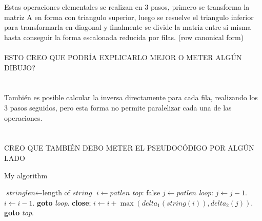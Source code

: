 Estas operaciones elementales se realizan en 3 pasos, primero se transforma la matriz A en forma con triangulo superior, luego se resuelve el triangulo inferior para transformarla en diagonal y finalmente se divide la matriz entre si misma hasta conseguir la forma escalonada reducida por filas. (row canonical form)
\\
\\
ESTO CREO QUE PODRÍA EXPLICARLO MEJOR O METER ALGÚN DIBUJO?
\\
\\
\\
También es posible calcular la inversa directamente para cada fila, realizando los 3 pasos seguidos, pero esta forma no permite paralelizar cada una de las operaciones.
\\
\\
\\
CREO QUE TAMBIÉN DEBO METER EL PSEUDOCÓDIGO POR ALGÚN LADO
\begin{algorithm}
\caption{My algorithm}\label{euclid}
\begin{algorithmic}[1]
\State $\textit{stringlen} \gets \text{length of }\textit{string}$
\State $i \gets \textit{patlen}$
\BState \emph{top}:
 \Return false
\EndIf
\State $j \gets \textit{patlen}$
\BState \emph{loop}:
\State $j \gets j-1$.
\State $i \gets i-1$.
\State \textbf{goto} \emph{loop}.
\State \textbf{close};
\EndIf
\State $i \gets i+\max(\textit{delta}_1(\textit{string}(i)),\textit{delta}_2(j))$.
\State \textbf{goto} \emph{top}.
\EndProcedure
\end{algorithmic}
\end{algorithm}

